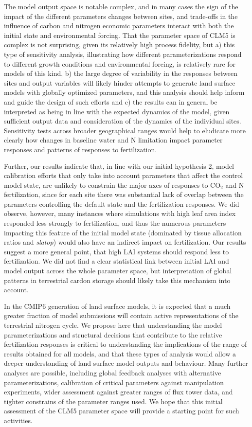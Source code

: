 \usepackage{}\documentclass[draft,linenumbers]{agujournal}
\begin{document}
The model output space is notable complex, and in many cases the sign of the impact of the different parameters changes between sites, and trade-offs in the influence of carbon and nitrogen economic parameters interact with both the initial state and environmental forcing. That the parameter space of CLM5 is complex is not surprising, given its relatively high process fidelity, but a) this type of sensitivity analysis,  illustrating how different parameterizations respond to different growth conditions and environmental forcing, is relatively rare for models of this kind,  b) the large degree of variability in the responses between sites and output variables will likely hinder attempts to generate land surface models with globally optimized parameters, and this analysis should help inform and guide the design of such efforts and c) the results can in general be interpreted as being in line with the expected dynamics of the model, given sufficient output data and consideration of the dynamics of the individual sites. Sensitivity tests across broader geographical ranges would help to eludicate more clearly how changes in baseline water and N limitation impact parameter responses and patterns of responses to fertilization.

Further, our results indicate that, in line with our initial hypothesis 2, model calibration efforts that only take into account parameters that affect the control model state, are unlikely to constrain the major axes of responses to CO$_{2}$ and N fertilization, since for each site there was substantial lack of overlap between the parameters controlling the default state and the fertilization responses.  We did observe, however, many instances where simulations with high leaf area index responded less strongly to fertilization, and thus the numerous parameters impacting this feature of the initial model state (dominated by tissue allocation ratios and \emph{slatop}) would also have an indirect impact on fertilization.  Our results suggest a more general point, that high LAI systems should respond less to fertilization. We did not find a clear statistical link between initial LAI and model output across the whole parameter space, but interpretation of global patterns in terrestrial cardon storage should likely take this mechanism into account. 

In the CMIP6 generation of land surface models, it is expected that a much greater fraction of model submissions will contain active representations of the terrestrial nitrogen cycle. We propose here that understanding the model parameterizations and structural decisions that contribute to the relative fertilization responses is critical to understanding the implications of the range of results obtained for all models, and that these types of analysis would allow a deeper understanding of land surface model outputs and behaviour. Many further analyses are possible, including global feedback analyses with alternative parameterizations, calibration of critical parameters against manipulation experiments, wider assessment against greater ranges of flux tower data, and tighter constrains of the parameter ranges used. We hope that this initial assessment of the CLM5 parameter space will provide a starting point for such activities. 
\end{document}
